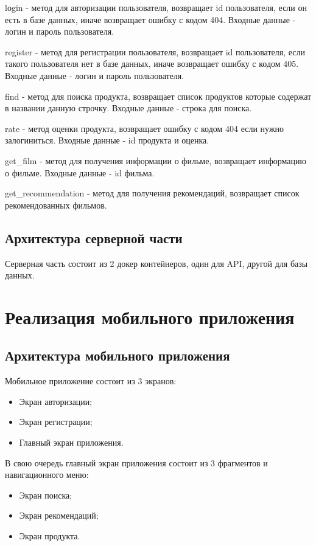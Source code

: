 lоgin - метод для авторизации пользователя, возвращает id пользователя, если он есть в базе данных, иначе возвращает
ошибку с кодом 404.
Входные данные - логин и пароль пользователя.

register - метод для регистрации пользователя, возвращает id пользователя, если такого пользователя нет в базе данных,
иначе возвращает ошибку с кодом 405.
Входные данные - логин и пароль пользователя.

find - метод для поиска продукта, возвращает список продуктов которые содержат в названии данную строчку.
Входные данные - строка для поиска.

rate - метод оценки продукта, возвращает ошибку с кодом 404 если нужно залогиниться.
Входные данные - id продукта и оценка.

get\_film - метод для получения информации о фильме, возвращает информацию о фильме.
Входные данные - id фильма.

get\_recommendation - метод для получения рекомендаций, возвращает список рекомендованных фильмов.

\subsection{Архитектура серверной части}

Серверная часть состоит из 2 докер контейнеров, один для API, другой для базы данных.


\clearpage

\section{Реализация мобильного приложения}

\subsection{Архитектура мобильного приложения}
Мобильное приложение состоит из 3 экранов:
\begin{itemize}
    \item Экран авторизации;
    \item Экран регистрации;
    \item Главный экран приложения.
\end{itemize}

В свою очередь главный экран приложения состоит из 3 фрагментов и навигационного меню:
\begin{itemize}
    \item Экран поиска;
    \item Экран рекомендаций;
    \item Экран продукта.
\end{itemize}

